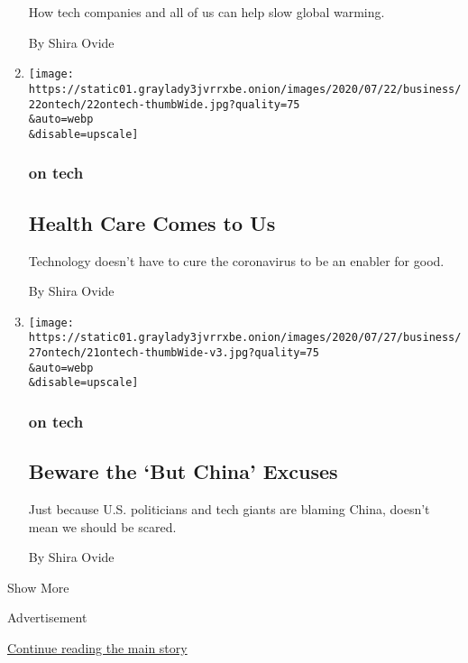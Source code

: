 \begin{enumerate}
  How tech companies and all of us can help slow global warming.

  By Shira Ovide
\item
  \href{/2020/07/22/technology/coronavirus-telemedicine.html}{}

  \texttt{[image: https://static01.graylady3jvrrxbe.onion/images/2020/07/22/business/22ontech/22ontech-thumbWide.jpg?quality=75\\\&auto=webp\\\&disable=upscale]}

  \hypertarget{on-tech-7}{%
  \subsubsection{on tech}\label{on-tech-7}}

  \hypertarget{health-care-comes-to-us}{%
  \subsection{Health Care Comes to Us}\label{health-care-comes-to-us}}

  Technology doesn't have to cure the coronavirus to be an enabler for
  good.

  By Shira Ovide
\item
  \href{/2020/07/21/technology/us-china-technology.html}{}

  \texttt{[image: https://static01.graylady3jvrrxbe.onion/images/2020/07/27/business/27ontech/21ontech-thumbWide-v3.jpg?quality=75\\\&auto=webp\\\&disable=upscale]}

  \hypertarget{on-tech-8}{%
  \subsubsection{on tech}\label{on-tech-8}}

  \hypertarget{beware-the-but-china-excuses}{%
  \subsection{Beware the `But China'
  Excuses}\label{beware-the-but-china-excuses}}

  Just because U.S. politicians and tech giants are blaming China,
  doesn't mean we should be scared.

  By Shira Ovide
\end{enumerate}

Show More

Advertisement

\protect\hyperlink{after-mid2}{Continue reading the main story}

